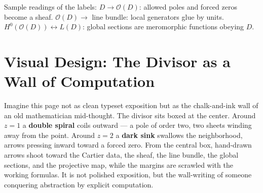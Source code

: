 \documentclass[11pt]{article}
\newcommand{\OO}{\mathcal O}
\theoremstyle{definition}
\theoremstyle{plain}
\begin{document}
\bigskip
\noindent\small
Sample readings of the labels:
\(D\to\OO(D)\): allowed poles and forced zeros become a sheaf.\quad
\(\OO(D)\to\) line bundle: local generators glue by units.\quad
\(H^0(\OO(D))\leftrightarrow L(D)\): global sections are meromorphic functions
obeying \(D\).
\clearpage

\section*{Visual Design: The Divisor as a Wall of Computation}
Imagine this page not as clean typeset exposition but as the chalk-and-ink wall
of an old mathematician mid-thought. The divisor sits boxed at the center.
Around \(z=1\) a \textbf{double spiral} coils outward --- a pole of order two,
two sheets winding away from the point. Around \(z=2\) a \textbf{dark sink}
swallows the neighborhood, arrows pressing inward toward a forced zero. From
the central box, hand-drawn arrows shoot toward the Cartier data, the sheaf, the
line bundle, the global sections, and the projective map, while the margins are
scrawled with the working formulas. It is not polished exposition, but the
wall-writing of someone conquering abstraction by explicit computation.
\end{document}
